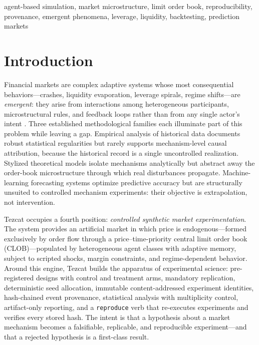 \documentclass[conference]{IEEEtran}
\newcommand{\tez}{Tezcat}
\begin{document}
\begin{IEEEkeywords}
agent-based simulation, market microstructure, limit order book,
reproducibility, provenance, emergent phenomena, leverage, liquidity,
backtesting, prediction markets
\end{IEEEkeywords}

\section{Introduction}
\label{sec:intro}
Financial markets are complex adaptive systems whose most consequential
behaviors---crashes, liquidity evaporation, leverage spirals, regime
shifts---are \emph{emergent}: they arise from interactions among
heterogeneous participants, microstructural rules, and feedback loops
rather than from any single actor's intent
\cite{arthur1997,farmer2009,hommes2006}. Three established
methodological families each illuminate part of this problem while
leaving a gap. Empirical analysis of historical data documents robust
statistical regularities \cite{cont2001} but rarely supports
mechanism-level causal attribution, because the historical record is a
single uncontrolled realization. Stylized theoretical models
\cite{kyle1985,glosten1985} isolate mechanisms analytically but
abstract away the order-book microstructure through which real
disturbances propagate. Machine-learning forecasting systems optimize
predictive accuracy but are structurally unsuited to controlled
mechanism experiments: their objective is extrapolation, not
intervention.

\tez{} occupies a fourth position: \emph{controlled synthetic market
experimentation}. The system provides an artificial market in which
price is endogenous---formed exclusively by order flow through a
price--time-priority central limit order book (CLOB)---populated by
heterogeneous agent classes with adaptive memory, subject to scripted
shocks, margin constraints, and regime-dependent behavior. Around this
engine, \tez{} builds the apparatus of experimental science:
pre-registered designs with control and treatment arms, mandatory
replication, deterministic seed allocation, immutable content-addressed
experiment identities, hash-chained event provenance, statistical
analysis with multiplicity control, artifact-only reporting, and a
\texttt{reproduce} verb that re-executes experiments and verifies every
stored hash. The intent is that a hypothesis about a market mechanism
becomes a falsifiable, replicable, and reproducible experiment---and
that a rejected hypothesis is a first-class result.
\end{document}
